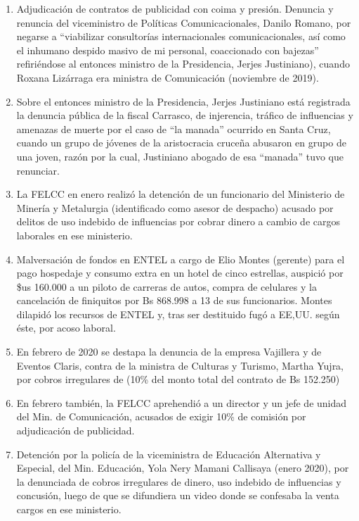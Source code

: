 \documentclass[a4paper, nobind]{templates/ociamthesis}
\begin{document}
\begin{enumerate}
\def\labelenumi{\arabic{enumi}.}
\item
  Adjudicación de contratos de publicidad con coima y presión. Denuncia y renuncia del viceministro de Políticas Comunicacionales, Danilo Romano, por negarse a ``viabilizar consultorías internacionales comunicacionales, así como el inhumano despido masivo de mi personal, coaccionado con bajezas'' refiriéndose al entonces ministro de la Presidencia, Jerjes Justiniano), cuando Roxana Lizárraga era ministra de Comunicación (noviembre de 2019).
\item
  Sobre el entonces ministro de la Presidencia, Jerjes Justiniano está registrada la denuncia pública de la fiscal Carrasco, de injerencia, tráfico de influencias y amenazas de muerte por el caso de ``la manada'' ocurrido en Santa Cruz, cuando un grupo de jóvenes de la aristocracia cruceña abusaron en grupo de una joven, razón por la cual, Justiniano abogado de esa ``manada'' tuvo que renunciar.
\item
  La FELCC en enero realizó la detención de un funcionario del Ministerio de Minería y Metalurgia (identificado como asesor de despacho) acusado por delitos de uso indebido de influencias por cobrar dinero a cambio de cargos laborales en ese ministerio.
\item
  Malversación de fondos en ENTEL a cargo de Elio Montes (gerente) para el pago hospedaje y consumo extra en un hotel de cinco estrellas, auspició por \$us 160.000 a un piloto de carreras de autos, compra de celulares y la cancelación de finiquitos por Bs 868.998 a 13 de sus funcionarios. Montes dilapidó los recursos de ENTEL y, tras ser destituido fugó a EE,UU. según éste, por acoso laboral.
\item
  En febrero de 2020 se destapa la denuncia de la empresa Vajillera y de Eventos Claris, contra de la ministra de Culturas y Turismo, Martha Yujra, por cobros irregulares de (10\% del monto total del contrato de Bs 152.250)
\item
  En febrero también, la FELCC aprehendió a un director y un jefe de unidad del Min. de Comunicación, acusados de exigir 10\% de comisión por adjudicación de publicidad.
\item
  Detención por la policía de la viceministra de Educación Alternativa y Especial, del Min. Educación, Yola Nery Mamani Callisaya (enero 2020), por la denunciada de cobros irregulares de dinero, uso indebido de influencias y concusión, luego de que se difundiera un video donde se confesaba la venta cargos en ese ministerio.

\end{enumerate}
\end{document}
